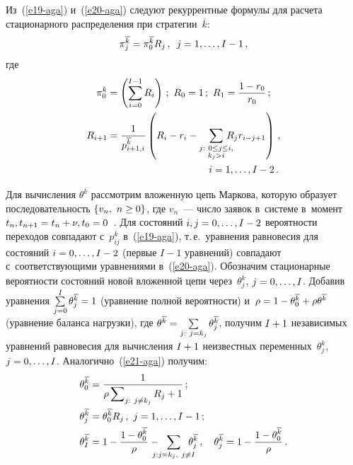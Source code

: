   \begin{multicols}{2}
  
  \noindent
Из~(\ref{e19-aga}) и~(\ref{e20-aga}) следуют рекуррентные формулы для
расчета стационарного распределения при стратегии~$\overline{k}$:
\begin{equation}
\pi_j^{\overline{k}} =\pi_0^{\overline{k}}R_j\,,\enskip j=1,\ldots, I-1\,,
\label{e21-aga}
\end{equation}
где
\begin{gather*}
\pi_0^k = \left( \sum\limits_{i=0}^{I-1} R_i\right)\,; \ R_0=1\,;\ R_1=\fr{1-
r_0}{r_0}\,;\\
R_{i+1} = \fr{1}{p_{i+1,i}^{\overline{k}}}\left( R_i - r_i-
\sum\limits_{\substack{{j:\ 0\leq j\leq i},\\
{k_j>i}}}\hspace*{-3mm} R_j r_{i-j+1}\right)\,,\\ 
\hspace*{43mm}i=1,\ldots, I-2\,.
\end{gather*}

  Для вычисления $\theta^{\overline{k}}$ рассмотрим вложенную цепь
Маркова, которую образует последовательность $\{v_n,\ n\hm\geq 0\}$, где
$v_n$~--- число заявок в~системе в~момент $t_n, t_{n+1}\hm= t_n+\nu,
t_0\hm=0$~\cite{9-aga}. Для состояний $i,j\hm= 0,\ldots, I\hm-2$ вероятности
переходов совпадают с~$p_{ij}^{\overline{k}}$ в~(\ref{e19-aga}), т.\,е.\
уравнения равновесия для состояний $i\hm= 0,\ldots, I-2$ (первые $I-1$
уравнений) совпадают с~соответствующими уравнениями в~(\ref{e20-aga}).
Обозначим стационарные вероятности состояний новой вложенной цепи
через~$\theta_j^{\overline{k}}$, $j\hm= 0,\ldots , I$. Добавив уравнения
$\sum\limits_{j=0}^I \theta_j^{\overline{k}}\hm=1$ (уравнение полной
вероят\-ности) и~$\rho\hm= 1\hm-
\theta_0^{\overline{k}}\hm+\rho\theta^{\overline{k}}$ (уравнение баланса
нагрузки), где $\theta^{\overline{k}}\hm= \sum\limits_{j:\
j=k_j}\theta_j^{\overline{k}}$, получим $I\hm+1$ независимых уравнений
равновесия для вычисления $I\hm+1$ неизвестных переменных~$\theta_j^k$,
$j\hm= 0,\ldots, I$. Аналогично~(\ref{e21-aga}) получим:
  \begin{align*}
  \theta_0^{\overline{k}} &= \fr{1}{\rho\sum\nolimits_{j:\ j\not= k_j} R_j+1}\,;\\
\theta_j^{\overline{k}}&=\theta_0^{\overline{k}} R_j\,,\ j=1,\ldots, I-1\,;\\
  \theta_I^{\overline{k}} &=1-\fr{1-\theta_0^{\overline{k}}}{\rho} -\hspace*{-3mm}\sum\limits_{j:
j=k_j,\ j\not=I}\hspace*{-3mm} \theta_j^{\overline{k}}\,,\quad \theta_j^{\overline{k}}=1-\fr{1-
\theta_0^{\overline{k}}}{\rho}\,.
  \end{align*}


\end{multicols}
